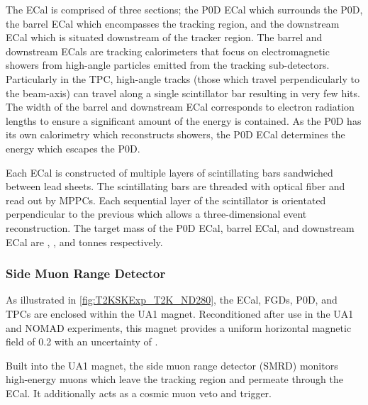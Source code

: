 The ECal is comprised of three sections; the P0D ECal which surrounds the P0D, the barrel ECal which encompasses the tracking region, and the downstream ECal which is situated downstream of the tracker region. The barrel and downstream ECals are tracking calorimeters that focus on electromagnetic showers from high-angle particles emitted from the tracking sub-detectors. Particularly in  the TPC, high-angle tracks (those which travel perpendicularly to the beam-axis) can travel along a single scintillator bar resulting in very few hits. The width of the barrel and downstream ECal corresponds to  electron radiation lengths to ensure a significant amount of the  energy is contained. As the P0D has its own calorimetry which reconstructs showers, the P0D ECal determines the energy which escapes the P0D.

Each ECal is constructed of multiple layers of scintillating bars sandwiched between lead sheets. The scintillating bars are threaded with optical fiber and read out by MPPCs. Each sequential layer of the scintillator is orientated perpendicular to the previous which allows a three-dimensional event reconstruction. The target mass of the P0D ECal, barrel ECal, and downstream ECal are , , and  tonnes respectively.

\subsubsection{Side Muon Range Detector}
\label{subsubsec:T2KSKExp_T2K_SMRD}

As illustrated in \autoref{fig:T2KSKExp_T2K_ND280}, the ECal, FGDs, P0D, and TPCs are enclosed within the UA1 magnet. Reconditioned after use in the UA1 \cite{cerncourier_2022} and NOMAD \cite{Vannucci2014} experiments, this magnet provides a uniform horizontal magnetic field of 0.2 with an uncertainty of .

Built into the UA1 magnet, the side muon range detector (SMRD)\cite{Aoki2013} monitors high-energy muons which leave the tracking region and permeate through the ECal. It additionally acts as a cosmic muon veto and trigger. 

